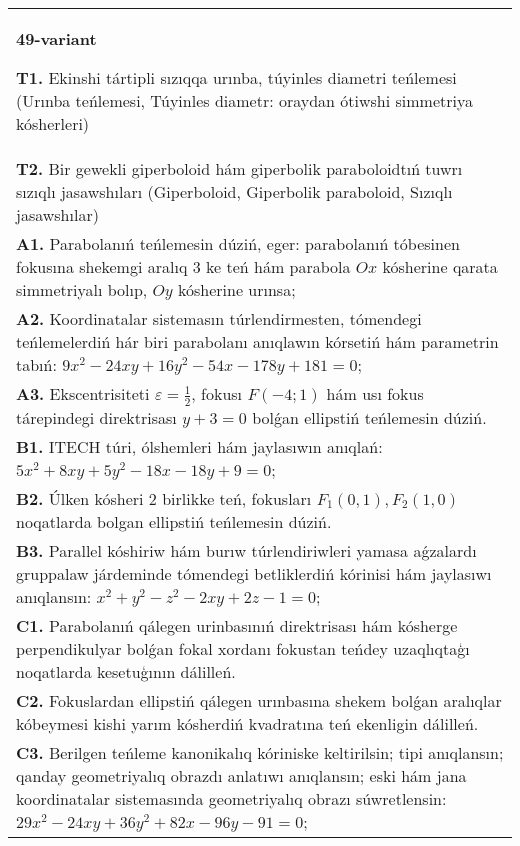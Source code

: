 \documentclass{article}
\begin{document}
\begin{tabular}{m{17cm}}
\textbf{49-variant}
\newline

\textbf{T1.} Ekinshi tártipli sızıqqa urınba, túyinles diametri teńlemesi (Urınba teńlemesi, Túyinles diametr: oraydan ótiwshi simmetriya kósherleri) \\
\textbf{T2.} Bir gewekli giperboloid hám giperbolik paraboloidtıń tuwrı sızıqlı jasawshıları (Giperboloid, Giperbolik paraboloid, Sızıqlı jasawshılar) \\
\textbf{A1.} Parabolanıń teńlemesin dúziń, eger: parabolanıń tóbesinen fokusına shekemgi aralıq 3 ke teń hám parabola $O x$ kósherine qarata simmetriyalı bolıp, $O y$ kósherine urınsa; \\
\textbf{A2.} Koordinatalar sistemasın túrlendirmesten, tómendegi teńlemelerdiń hár biri parabolanı anıqlawın kórsetiń hám parametrin tabıń: $9 x^2-24 x y+16 y^2-54 x-178 y+181=0$; \\
\textbf{A3.} Ekscentrisiteti $\varepsilon=\frac{1}{2}$, fokusı $F (-4; 1) $ hám usı fokus tárepindegi direktrisası $y+3=0$ bolǵan ellipstiń teńlemesin dúziń. \\
\textbf{B1.} ITECH túri, ólshemleri hám jaylasıwın anıqlań: $5 x^2+8 x y+5 y^2-18 x-18 y+9=0$; \\
\textbf{B2.} Úlken kósheri 2 birlikke teń, fokusları $F_1 (0,1), F_2 (1,0) $ noqatlarda bolgan ellipstiń teńlemesin dúziń. \\
\textbf{B3.} Parallel kóshiriw hám burıw túrlendiriwleri yamasa aǵzalardı gruppalaw járdeminde tómendegi betliklerdiń kórinisi hám jaylasıwı anıqlansın: $x^2+y^2-z^2-2 x y+2 z-1=0$; \\
\textbf{C1.} Parabolanıń qálegen urinbasınıń direktrisası hám kósherge perpendikulyar bolǵan fokal xordanı fokustan teńdey uzaqlıqtaģı noqatlarda kesetuģının dálilleń. \\
\textbf{C2.} Fokuslardan ellipstiń qálegen urınbasına shekem bolǵan aralıqlar kóbeymesi kishi yarım kósherdiń kvadratına teń ekenligin dálilleń. \\
\textbf{C3.} Berilgen teńleme kanonikalıq kóriniske keltirilsin; tipi anıqlansın; qanday geometriyalıq obrazdı anlatıwı anıqlansın; eski hám jana koordinatalar sistemasında geometriyalıq obrazı súwretlensin: $29 x^2-24 x y+36 y^2+82 x-96 y-91=0$; \\

\end{tabular}
\vspace{1cm}
\end{document}
